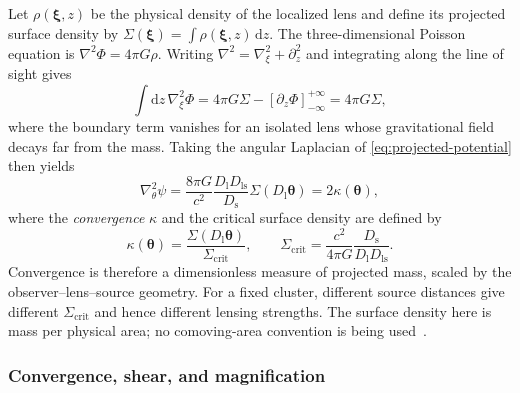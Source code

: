 Let $\rho(\boldsymbol{\xi},z)$ be the physical density of the localized lens and define its projected surface density by $\Sigma(\boldsymbol{\xi})=\int \rho(\boldsymbol{\xi},z)\,\mathrm{d}z$. The three-dimensional Poisson equation is $\nabla^2\Phi=4\pi G\rho$. Writing $\nabla^2=\nabla_{\xi}^2+\partial_z^2$ and integrating along the line of sight gives
\begin{equation}
    \int \mathrm{d}z\,\nabla_{\xi}^2\Phi
    =4\pi G\Sigma
    -\left[\partial_z\Phi\right]_{-\infty}^{+\infty}
    =4\pi G\Sigma,
    \label{eq:projected-poisson}
\end{equation}
where the boundary term vanishes for an isolated lens whose gravitational field decays far from the mass. Taking the angular Laplacian of \cref{eq:projected-potential} then yields
\begin{equation}
    \nabla_{\theta}^2\psi
    =\frac{8\pi G}{c^2}\frac{D_{\mathrm{l}}D_{\mathrm{ls}}}{D_{\mathrm{s}}}\Sigma(D_{\mathrm{l}}\boldsymbol{\theta})
    =2\kappa(\boldsymbol{\theta}),
    \label{eq:lensing-poisson}
\end{equation}
where the \emph{convergence} $\kappa$ and the critical surface density are defined by
\begin{equation}
    \kappa(\boldsymbol{\theta})=\frac{\Sigma(D_{\mathrm{l}}\boldsymbol{\theta})}{\Sigma_{\mathrm{crit}}},
    \qquad
    \Sigma_{\mathrm{crit}}=\frac{c^2}{4\pi G}\frac{D_{\mathrm{s}}}{D_{\mathrm{l}}D_{\mathrm{ls}}}.
    \label{eq:convergence}
\end{equation}
Convergence is therefore a dimensionless measure of projected mass, scaled by the observer--lens--source geometry. For a fixed cluster, different source distances give different $\Sigma_{\mathrm{crit}}$ and hence different lensing strengths. The surface density here is mass per physical area; no comoving-area convention is being used~\cite{yoo_weak_2026,bartelmann_weak_2001}.

\subsubsection{Convergence, shear, and magnification}


